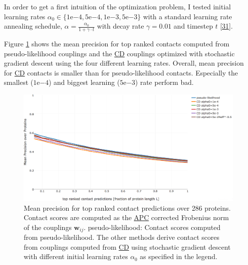 \documentclass[12pt,a4paper,twoside]{book}
\newcommand{\wij}{\mathbf{w}_{ij}}
\theoremstyle{definition}
\theoremstyle{definition}
\theoremstyle{remark}
\begin{document}
In order to get a first intuition of the optimization problem, I tested
initial learning rates
\(\alpha_0 \in \{1\mathrm{e}{-4}, 5\mathrm{e}{-4}, 1\mathrm{e}{-3}, 5\mathrm{e}{-3}\}\)
with a standard learning rate annealing schedule,
\(\alpha = \frac{\alpha_0}{1 + \gamma \cdot t}\) with decay rate
\(\gamma=0.01\) and timestep \(t\)
{[}\protect\hyperlink{ref-Bottou2012}{31}{]}.

Figure \ref{fig:performance-cd-alphaopt} shows the mean precision for
top ranked contacts computed from pseudo-likelihood couplings and the
\protect\hyperlink{abbrev}{CD} couplings optimized with stochastic
gradient descent using the four different learning rates. Overall, mean
precision for \protect\hyperlink{abbrev}{CD} contacts is smaller than
for pseudo-likelihood contacts. Especially the smallest
(\(1\mathrm{e}{-4}\)) and biggest learning (\(5\mathrm{e}{-3}\)) rate
perform bad.










\begin{figure}

{\centering \includegraphics[width=0.9\linewidth]{img/full_likelihood/sgd/precision_vs_rank_learning_rates} 

}

\caption{Mean precision for top ranked
contact predictions over 286 proteins. Contact scores are computed as
the \protect\hyperlink{abbrev}{APC} corrected Frobenius norm of the
couplings \(\wij\). pseudo-likelihood: Contact scores computed from
pseudo-likelihood. The other methods derive contact scores from
couplings computed from \protect\hyperlink{abbrev}{CD} using stochastic
gradient descent with different initial learning rates \(\alpha_0\) as
specified in the legend.}\label{fig:performance-cd-alphaopt}
\end{figure}
\end{document}
